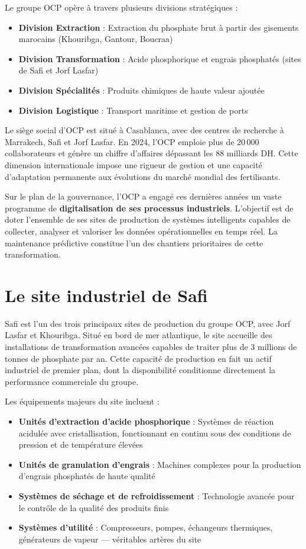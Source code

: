 \documentclass[a4paper,12pt]{report}
\begin{document}
Le groupe OCP opère à travers plusieurs divisions stratégiques :
\begin{itemize}
    \item \textbf{Division Extraction} : Extraction du phosphate brut à partir des gisements marocains (Khouribga, Gantour, Boucraa)
    \item \textbf{Division Transformation} : Acide phosphorique et engrais phosphatés (sites de Safi et Jorf Lasfar)
    \item \textbf{Division Spécialités} : Produits chimiques de haute valeur ajoutée
    \item \textbf{Division Logistique} : Transport maritime et gestion de ports
\end{itemize}

Le siège social d'OCP est situé à Casablanca, avec des centres de recherche à Marrakech, Safi et Jorf Lasfar. En 2024, l'OCP emploie plus de 20\,000 collaborateurs et génère un chiffre d'affaires dépassant les 88 milliards DH. Cette dimension internationale impose une rigueur de gestion et une capacité d'adaptation permanente aux évolutions du marché mondial des fertilisants.

Sur le plan de la gouvernance, l'OCP a engagé ces dernières années un vaste programme de \textbf{digitalisation de ses processus industriels}. L'objectif est de doter l'ensemble de ses sites de production de systèmes intelligents capables de collecter, analyser et valoriser les données opérationnelles en temps réel. La maintenance prédictive constitue l'un des chantiers prioritaires de cette transformation.

\section{Le site industriel de Safi}

Safi est l'un des trois principaux sites de production du groupe OCP, avec Jorf Lasfar et Khouribga. Situé en bord de mer atlantique, le site accueille des installations de transformation avancées capables de traiter plus de 3 millions de tonnes de phosphate par an. Cette capacité de production en fait un actif industriel de premier plan, dont la disponibilité conditionne directement la performance commerciale du groupe.

Les équipements majeurs du site incluent :
\begin{itemize}
    \item \textbf{Unités d'extraction d'acide phosphorique} : Systèmes de réaction acidulée avec cristallisation, fonctionnant en continu sous des conditions de pression et de température élevées
    \item \textbf{Unités de granulation d'engrais} : Machines complexes pour la production d'engrais phosphatés de haute qualité
    \item \textbf{Systèmes de séchage et de refroidissement} : Technologie avancée pour le contrôle de la qualité des produits finis
    \item \textbf{Systèmes d'utilité} : Compresseurs, pompes, échangeurs thermiques, générateurs de vapeur — véritables artères du site
\end{itemize}
\end{document}
